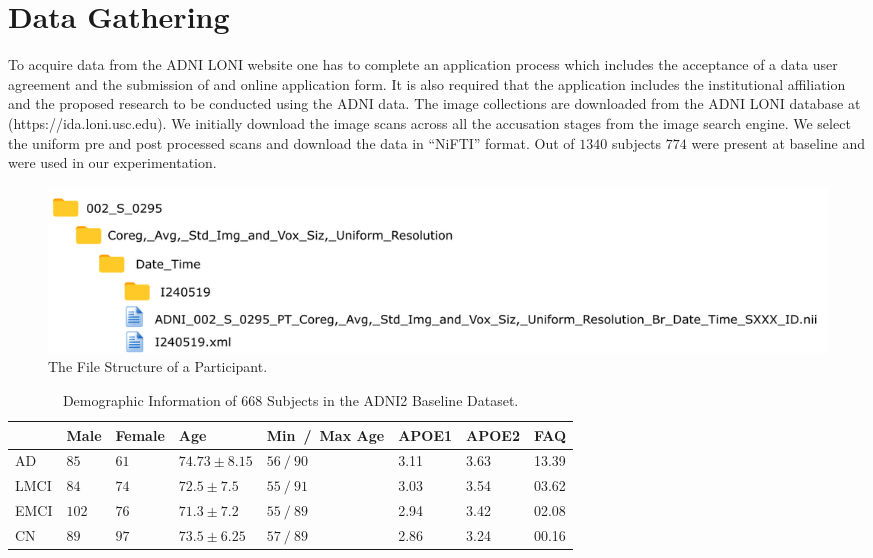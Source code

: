 \section{Data Gathering}
\label{sec:data_gathering}
To acquire \FDGPET data from the ADNI LONI website one has to complete an application process which includes the acceptance of a data user agreement and the submission of and online application form. It is also required that the application includes the institutional affiliation and the proposed research to be conducted using the ADNI data. The image collections are downloaded from the ADNI LONI database at (https://ida.loni.usc.edu). We initially download the image scans across all the accusation stages from the image search engine. We select the uniform pre and post processed scans and download the data in ``NiFTI'' format. Out of $1340$ subjects $774$ were present at baseline and were used in our experimentation.
\begin{figure}[h]
	\centering
	\includegraphics[width=\linewidth]{figures/file_structure}
	\caption[The File Structure of a Participant]{The File Structure of a Participant.}
	\label{fig:filestructure}
\end{figure}

\begin{table}[t]
	\begin{center}
		\caption{Demographic Information of $668$ Subjects in the ADNI2 Baseline Dataset.}\label{tab:demographic}
		\begin{tabular}{|P{1.5cm}|P{1cm}P{1cm}P{2.25cm}P{3cm}P{1.25cm}P{1.25cm}P{1.25cm}|}
			\hline
			& Male & Female & Age & Min~/~Max Age & APOE1 & APOE2 & FAQ \\
			\hline\hline
			AD 		& $85$ 	& $61$ & $74.73 \pm 8.15$ 	& $56~/~90$ &	3.11 & 3.63 & 13.39\\
			LMCI 	& $84$ 	& $74$ & $72.5 	\pm 7.5$ 	& $55~/~91$ &	3.03 & 3.54 & 03.62\\
			EMCI 	& $102$ & $76$ & $ 71.3 \pm 7.2 $	& $55~/~89$ &	2.94 & 3.42 & 02.08\\
			CN 		& $89$ 	& $97$ & $ 73.5 \pm 6.25 $ 	& $57~/~89$ &	2.86 & 3.24 & 00.16\\
			\hline
		\end{tabular}
	\end{center}
\end{table}


